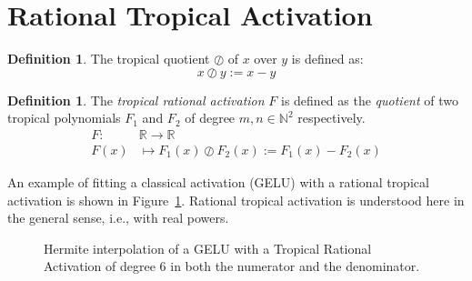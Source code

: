 \documentclass{article} %
\theoremstyle{plain}
\theoremstyle{definition}
\newtheorem{definition}[theorem]{Definition}
\theoremstyle{remark}
\begin{document}
\section{Rational Tropical Activation}
\label{appendix:tropical_rational}
\begin{definition}
The tropical quotient $\oslash$ of $x$ over $y$ is defined as:
\begin{equation}
    x \oslash y:=x-y
\end{equation}
\end{definition}
\begin{definition}
The \emph{tropical rational activation} $F$ is defined as the \emph{quotient} of two tropical polynomials $F_1$ and $F_2$ of degree $m,n \in \mathbb{N}^2$ respectively.
    \begin{align}
    F \colon & \mathbb{R} \to \mathbb{R}  \nonumber \\
    F(x)  &\mapsto  F_1(x) \oslash F_2(x) :=  F_1(x) - F_2(x)
\end{align}
\end{definition}
An example of fitting a classical activation (GELU) with a rational tropical activation is shown in Figure~\ref{fig:gelu_vs_tropical}. Rational tropical activation is understood here in the general sense, i.e., with real powers.
\begin{figure}[!htbp]
    \centering
    \caption{Hermite interpolation of a GELU with a Tropical Rational Activation of degree 6 in both the numerator and the denominator.}
    \label{fig:gelu_vs_tropical}
\end{figure}
\end{document}
